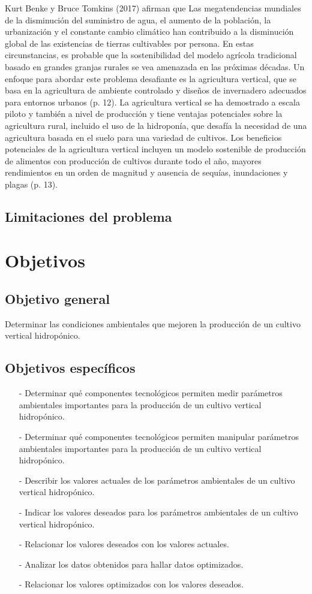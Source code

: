 \documentclass{report}
\begin{document}
\begin{enumerate}
  Kurt Benke y Bruce Tomkins (2017) afirman que Las megatendencias mundiales de
  la disminución del suministro de agua, el aumento de la población, la
  urbanización y el constante cambio climático han contribuido a la disminución
  global de las existencias de tierras cultivables por persona. En estas
  circunstancias, es probable que la sostenibilidad del modelo agrícola
  tradicional basado en grandes granjas rurales se vea amenazada en las próximas
  décadas. Un enfoque para abordar este problema desafiante es la agricultura
  vertical, que se basa en la agricultura de ambiente controlado y diseños de
  invernadero adecuados para entornos urbanos (p. 12). La agricultura vertical
  se ha demostrado a escala piloto y también a nivel de producción y tiene
  ventajas potenciales sobre la agricultura rural, incluido el uso de la
  hidroponía, que desafía la necesidad de una agricultura basada en el suelo
  para una variedad de cultivos. Los beneficios potenciales de la agricultura
  vertical incluyen un modelo sostenible de producción de alimentos con
  producción de cultivos durante todo el año, mayores rendimientos en un orden
  de magnitud y ausencia de sequías, inundaciones y plagas (p. 13).
\end{enumerate}
\subsection{Limitaciones del problema}
\section{Objetivos}
\subsection{Objetivo general}
Determinar las condiciones ambientales que mejoren la producción de un cultivo
vertical hidropónico.
\subsection{Objetivos específicos}
\begin{enumerate}
\item[-] Determinar qué componentes tecnológicos permiten medir parámetros
  ambientales importantes para la producción de un cultivo vertical hidropónico.
\item[-] Determinar qué componentes tecnológicos permiten manipular parámetros
  ambientales importantes para la producción de un cultivo vertical hidropónico.
\item[-] Describir los valores actuales de los parámetros ambientales de un
  cultivo vertical hidropónico.
\item[-] Indicar los valores deseados para los parámetros ambientales de un
  cultivo vertical hidropónico.
\item[-] Relacionar los valores deseados con los valores actuales.
\item[-] Analizar los datos obtenidos para hallar datos optimizados.
\item[-] Relacionar los valores optimizados con los valores deseados.
\end{enumerate}
\end{document}

